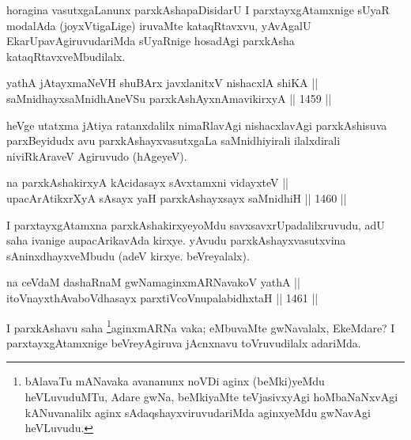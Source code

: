 \begin{artha}
horagina vasutxgaLanunx parxkAshapaDisidarU I parxtayxgAtamxnige sUyaR modalAda (joyxVtigaLige) iruvaMte kataqRtavxvu, yAvAgalU EkarUpavAgiruvudariMda sUyaRnige hosadAgi parxkAsha kataqRtavxveMbudilalx.
\end{artha}


\begin{shl}
yathA jAtayxmaNeVH shuBArx javxlanitxV nishacxlA shiKA || \\
saMnidhayxsaMnidhAneVSu parxkAshAyxnAmavikirxyA \hfill || 1459 ||  
\end{shl}

\begin{artha}
heVge utatxma jAtiya ratanxdalilx nimaRlavAgi nishacxlavAgi parxkAshisuva parxBeyidudx avu parxkAshayxvasutxgaLa saMnidhiyirali ilalxdirali niviRkAraveV Agiruvudo (hAgeyeV).	
\end{artha}

\begin{shl}
na parxkAshakirxyA kAcidasayx sAvxtamxni vidayxteV || \\
upacArAtikxrXyA sA\s sayx yaH parxkAshayxsayx saMnidhiH \hfill || 1460 ||  
\end{shl}

\begin{artha}
I parxtayxgAtamxna parxkAshakirxyeyoMdu savxsavxrUpadalilxruvudu, adU saha ivanige aupacArikavAda kirxye. yAvudu parxkAshayxvasutxvina sAninxdhayxveMbudu (adeV kirxye. beVreyalalx).
\end{artha}

\begin{shl}
na ceVdaM dashaRnaM gwNamaginxmARNavakoV yathA || \\
itoV\s nayxthA\s vaboVdhasayx parxtiVcoV\s nupalabidhxtaH \hfill || 1461 ||  
\end{shl}

\begin{artha}
I parxkAshavu saha \footnote{bAlavaTu mANavaka avananunx noVDi aginx (beMki)yeMdu heVLuvuduMTu, Adare gwNa, beMkiyaMte teVjasivxyAgi hoMbaNaNxvAgi kANuvanalilx aginx sAdaqshayxviruvudariMda aginxyeMdu gwNavAgi heVLuvudu.}aginxmARNa vaka; eMbuvaMte gwNavalalx, EkeMdare? I parxtayxgAtamxnige beVreyAgiruva jAcnxnavu toVruvudilalx adariMda.
\end{artha}


